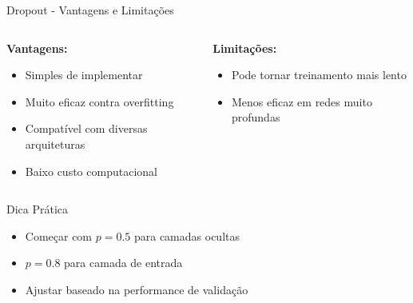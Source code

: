 \documentclass{beamer}
\begin{document}
\begin{frame}{Dropout - Vantagens e Limitações}
\begin{columns}[T]
\begin{column}{0.48\textwidth}
\textbf{Vantagens:}
\begin{itemize}
    \item Simples de implementar
    \item Muito eficaz contra overfitting
    \item Compatível com diversas arquiteturas
    \item Baixo custo computacional
\end{itemize}
\end{column}

\begin{column}{0.48\textwidth}
\textbf{Limitações:}
\begin{itemize}
    \item Pode tornar treinamento mais lento
    \item Menos eficaz em redes muito profundas
\end{itemize}
\end{column}
\end{columns}

\vspace{0.2cm}
\footnotesize
\begin{block}{Dica Prática}
\begin{itemize}
    \item Começar com $p = 0.5$ para camadas ocultas
    \item $p = 0.8$ para camada de entrada
    \item Ajustar baseado na performance de validação
\end{itemize}
\end{block}
\end{frame}
\end{document}
